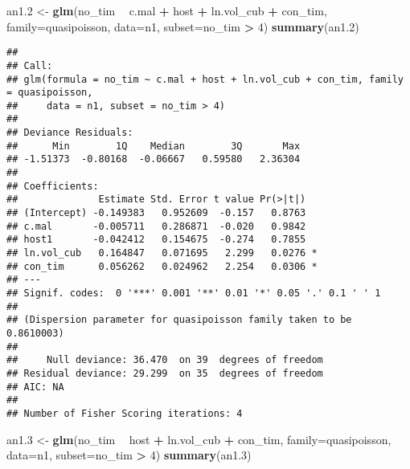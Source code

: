 \documentclass[]{article}
\newenvironment{Shaded}{\begin{snugshade}}{\end{snugshade}}
\newcommand{\KeywordTok}[1]{\textcolor[rgb]{0.13,0.29,0.53}{\textbf{#1}}}
\newcommand{\DataTypeTok}[1]{\textcolor[rgb]{0.13,0.29,0.53}{#1}}
\newcommand{\DecValTok}[1]{\textcolor[rgb]{0.00,0.00,0.81}{#1}}
\newcommand{\StringTok}[1]{\textcolor[rgb]{0.31,0.60,0.02}{#1}}
\newcommand{\OperatorTok}[1]{\textcolor[rgb]{0.81,0.36,0.00}{\textbf{#1}}}
\newcommand{\NormalTok}[1]{#1}
\begin{document}
\begin{Shaded}
\begin{Highlighting}[]
\NormalTok{an1.}\DecValTok{2}\NormalTok{ <-}\StringTok{ }\KeywordTok{glm}\NormalTok{(no_tim }\OperatorTok{~}\StringTok{ }\NormalTok{c.mal }\OperatorTok{+}\StringTok{ }\NormalTok{host }\OperatorTok{+}\StringTok{ }\NormalTok{ln.vol_cub }\OperatorTok{+}\StringTok{ }\NormalTok{con_tim,}
             \DataTypeTok{family=}\NormalTok{quasipoisson, }
           \DataTypeTok{data=}\NormalTok{n1, }\DataTypeTok{subset=}\NormalTok{no_tim }\OperatorTok{>}\StringTok{ }\DecValTok{4}\NormalTok{)}
\KeywordTok{summary}\NormalTok{(an1.}\DecValTok{2}\NormalTok{)}
\end{Highlighting}
\end{Shaded}

\begin{verbatim}
## 
## Call:
## glm(formula = no_tim ~ c.mal + host + ln.vol_cub + con_tim, family = quasipoisson, 
##     data = n1, subset = no_tim > 4)
## 
## Deviance Residuals: 
##      Min        1Q    Median        3Q       Max  
## -1.51373  -0.80168  -0.06667   0.59580   2.36304  
## 
## Coefficients:
##              Estimate Std. Error t value Pr(>|t|)  
## (Intercept) -0.149383   0.952609  -0.157   0.8763  
## c.mal       -0.005711   0.286871  -0.020   0.9842  
## host1       -0.042412   0.154675  -0.274   0.7855  
## ln.vol_cub   0.164847   0.071695   2.299   0.0276 *
## con_tim      0.056262   0.024962   2.254   0.0306 *
## ---
## Signif. codes:  0 '***' 0.001 '**' 0.01 '*' 0.05 '.' 0.1 ' ' 1
## 
## (Dispersion parameter for quasipoisson family taken to be 0.8610003)
## 
##     Null deviance: 36.470  on 39  degrees of freedom
## Residual deviance: 29.299  on 35  degrees of freedom
## AIC: NA
## 
## Number of Fisher Scoring iterations: 4
\end{verbatim}

\begin{Shaded}
\begin{Highlighting}[]
\NormalTok{an1.}\DecValTok{3}\NormalTok{ <-}\StringTok{ }\KeywordTok{glm}\NormalTok{(no_tim }\OperatorTok{~}\StringTok{ }\NormalTok{host }\OperatorTok{+}\StringTok{ }\NormalTok{ln.vol_cub }\OperatorTok{+}\StringTok{ }\NormalTok{con_tim,}
             \DataTypeTok{family=}\NormalTok{quasipoisson, }
           \DataTypeTok{data=}\NormalTok{n1, }\DataTypeTok{subset=}\NormalTok{no_tim }\OperatorTok{>}\StringTok{ }\DecValTok{4}\NormalTok{)}
\KeywordTok{summary}\NormalTok{(an1.}\DecValTok{3}\NormalTok{)}
\end{Highlighting}
\end{Shaded}
\end{document}
